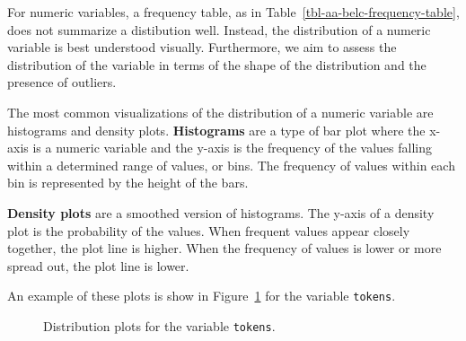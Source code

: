 \documentclass[
  letterpaper,
  DIV=11,
  numbers=noendperiod]{scrreprt}
\theoremstyle{definition}
\theoremstyle{remark}
\begin{document}
For numeric variables, a frequency table, as in
Table~\ref{tbl-aa-belc-frequency-table}, does not summarize a
distibution well. Instead, the distribution of a numeric variable is
best understood visually. Furthermore, we aim to assess the distribution
of the variable in terms of the shape of the distribution and the
presence of outliers.

The most common visualizations of the distribution of a numeric variable
are histograms and density plots. \textbf{Histograms} are a type of bar
plot where the x-axis is a numeric variable and the y-axis is the
frequency of the values falling within a determined range of values, or
bins. The frequency of values within each bin is represented by the
height of the bars.

\textbf{Density plots} are a smoothed version of histograms. The y-axis
of a density plot is the probability of the values. When frequent values
appear closely together, the plot line is higher. When the frequency of
values is lower or more spread out, the plot line is lower.

An example of these plots is show in
Figure~\ref{fig-aa-belc-histogram-density-tokens} for the variable
\texttt{tokens}.

\begin{figure}[H]

\begin{minipage}{0.50\linewidth}



\end{minipage}%
%
\begin{minipage}{0.50\linewidth}



\end{minipage}%

\caption{\label{fig-aa-belc-histogram-density-tokens}Distribution plots
for the variable \texttt{tokens}.}

\end{figure}%
\end{document}
